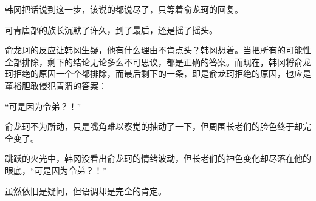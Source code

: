 韩冈把话说到这一步，该说的都说尽了，只等着俞龙珂的回复。

可青唐部的族长沉默了许久，到了最后，还是摇了摇头。

俞龙珂的反应让韩冈生疑，他有什么理由不肯点头？韩冈想着。当把所有的可能性全部排除，剩下的结论无论多么不可思议，都是正确的答案。而现在，韩冈将俞龙珂拒绝的原因一个个都排除，而最后剩下的一条，即是俞龙珂拒绝的原因，也应是董裕胆敢侵犯青渭的答案：

“可是因为令弟？！”

俞龙珂不为所动，只是嘴角难以察觉的抽动了一下，但周围长老们的脸色终于却完全变了。

跳跃的火光中，韩冈没看出俞龙珂的情绪波动，但长老们的神色变化却尽落在他的眼底，“可是因为令弟？！”

虽然依旧是疑问，但语调却是完全的肯定。

